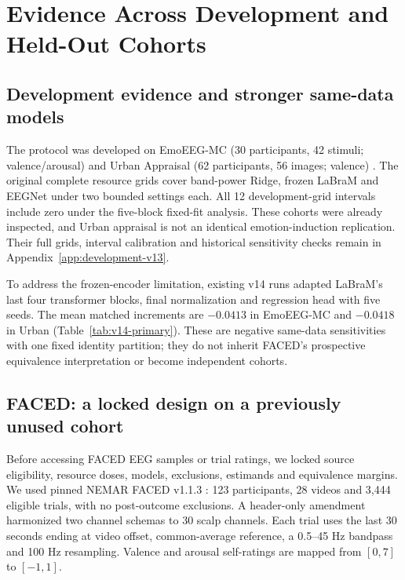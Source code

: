 \section{Evidence Across Development and Held-Out Cohorts}
\label{sec:v14-evidence}
\subsection{Development evidence and stronger same-data models}
The protocol was developed on EmoEEG-MC (30 participants, 42 stimuli;
valence/arousal) and Urban Appraisal (62 participants, 56 images; valence)
\citep{openneuro_ds005540,openneuro_ds006850}. The original complete resource
grids cover band-power Ridge, frozen LaBraM and EEGNet under two bounded
settings each. All 12 development-grid intervals include zero under the
five-block fixed-fit analysis. These cohorts were already inspected, and
Urban appraisal is not an identical emotion-induction replication. Their full
grids, interval calibration and historical sensitivity checks remain in
Appendix~\ref{app:development-v13}.

To address the frozen-encoder limitation, existing v14 runs adapted LaBraM's
last four transformer blocks, final normalization and regression head with
five seeds. The mean matched increments are $-0.0413$ in EmoEEG-MC and
$-0.0418$ in Urban (Table~\ref{tab:v14-primary}). These are negative
same-data sensitivities with one fixed identity partition; they do not inherit
FACED's prospective equivalence interpretation or become independent cohorts.

\subsection{FACED: a locked design on a previously unused cohort}
Before accessing FACED EEG samples or trial ratings, we locked source
eligibility, resource doses, models, exclusions, estimands and equivalence
margins. We used pinned NEMAR FACED v1.1.3 \citep{chen2023faced,nemar2026faced}:
123 participants, 28 videos and 3,444 eligible trials, with no post-outcome
exclusions. A header-only amendment harmonized two channel schemas to 30
scalp channels. Each trial uses the last 30 seconds ending at video offset,
common-average reference, a 0.5--45 Hz bandpass and 100 Hz resampling. Valence
and arousal self-ratings are mapped from $[0,7]$ to $[-1,1]$.

